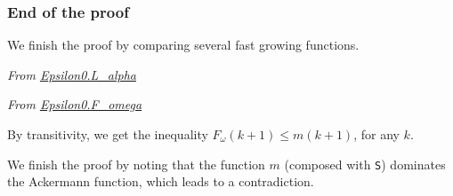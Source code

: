 



  
\subsubsection{End of the proof}

We finish the proof by comparing several fast growing functions.

\vspace{4pt}

\emph{From \href{../theories/html/hydras.Epsilon0.L_alpha.html}{Epsilon0.L\_alpha}}



\vspace{4pt}

\emph{From \href{../theories/html/hydras.Epsilon0.F_omega.html}{Epsilon0.F\_omega}}


\vspace{4pt}

By transitivity, we get the inequality
$F_\omega(k+1)\leq m(k+1)$, for any $k$.




We finish the proof by noting that the function $m$ (composed with \texttt{S}) dominates the Ackermann function, which leads to a contradiction.





\vspace{4pt}





